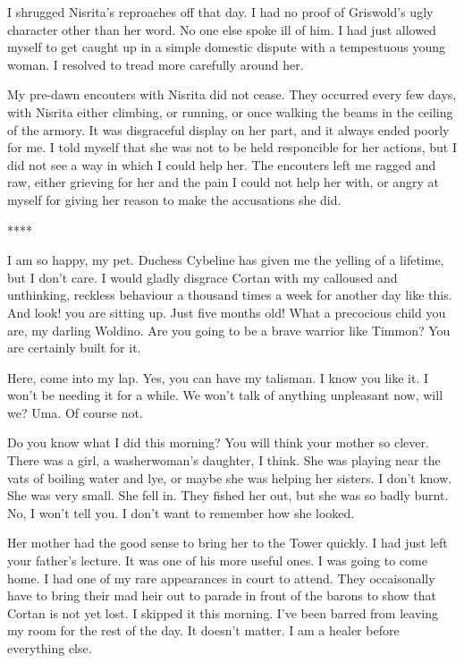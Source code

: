 \documentclass{article}
\begin{document}
I shrugged Nisrita's reproaches off that day. I had no proof of Griswold's ugly character other than her word. No one else spoke ill of him. I had just allowed myself to get caught up in a simple domestic dispute with a tempestuous young woman. I resolved to tread more carefully around her.

My pre-dawn encouters with Nisrita did not cease. They occurred every few days, with Nisrita either climbing, or running, or once walking the beams in the ceiling of the armory. It was disgraceful display on her part, and it always ended poorly for me. I told myself that she was not to be held responcible for her actions, but I did not see a way in which I could help her. The encouters left me ragged and raw, either grieving for her and the pain I could not help her with, or angry at myself for giving her reason to make the accusations she did.

\vspace{.5cm}
****

I am so happy, my pet. Duchess Cybeline has given me the yelling of a lifetime, but I don't care. I would gladly disgrace Cortan with my calloused and unthinking, reckless behaviour a thousand times a week for another day like this. And look! you are sitting up. Just five months old! What a precocious child you are, my darling Woldino. Are you going to be a brave warrior like Timmon? You are certainly built for it. 

Here, come into my lap. Yes, you can have my talisman. I know you like it. I won't be needing it for a while. We won't talk of anything unpleasant now, will we? Uma. Of course not.

Do you know what I did this morning? You will think your mother so clever. There was a girl, a washerwoman's daughter, I think. She was playing near the vats of boiling water and lye, or maybe she was helping her sisters. I don't know. She was very small. She fell in. They fished her out, but she was so badly burnt. No, I won't  tell you. I don't want to remember how she looked. 

Her mother had the good sense to bring her to the Tower quickly. I had just left your father's lecture. It was one of his more useful ones. I was going to come home. I had one of my rare appearances in court to attend. They occaisonally have to bring their mad heir out to parade in front of the barons to show that Cortan is not yet lost. I skipped it this morning. I've been barred from leaving my room for the rest of the day. It doesn't matter. I am a healer before everything else. 
\end{document}
